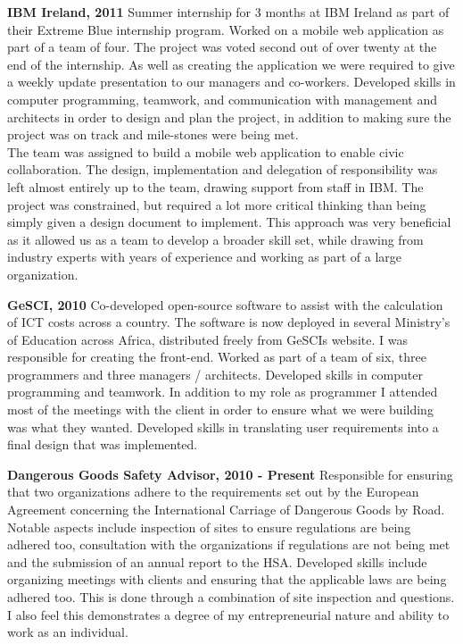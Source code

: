 \documentclass{res}
\begin{document}
\begin{resume}
    {\bf IBM Ireland, 2011 }Summer internship for 3 months at IBM Ireland as part of their Extreme Blue internship program. Worked on a mobile web application as part of a team of four. The project was voted second out of over twenty at the end of the internship. As well as creating the application we were required to give a weekly update presentation to our managers and co-workers. Developed skills in computer programming, teamwork, and communication with management and architects in order to design and plan the project, in addition to making sure the project was on track and mile-stones were being met.\\
     The team was assigned to build a mobile web application to enable civic collaboration. The design, implementation and delegation of responsibility was left almost entirely up to the team, drawing support from staff in IBM. The project was constrained, but required a lot more critical thinking than being simply given a design document to implement. This approach was very beneficial as it allowed us as a team to develop a broader skill set, while drawing from industry experts with years of experience and working as part of a large organization.
 
    {\bf GeSCI, 2010} Co-developed open-source software to assist with the calculation of ICT costs across a country. The software is now deployed in several Ministry's of Education across Africa, distributed freely from GeSCIs website. I was responsible for creating the front-end. Worked as part of a team of six, three programmers and three managers / architects. Developed skills in computer programming and teamwork. In addition to my role as programmer I attended most of the meetings with the client in order to ensure what we were building was what they wanted. Developed skills in translating user requirements into a final design that was implemented.

    {\bf Dangerous Goods Safety Advisor, 2010 - Present} Responsible for ensuring that two organizations adhere to the requirements set out by the European Agreement concerning the International Carriage of Dangerous Goods by Road. Notable aspects include inspection of sites to ensure regulations are being adhered too, consultation with the organizations if regulations are not being met and the submission of an annual report to the HSA. Developed skills include organizing meetings with clients and ensuring that the applicable laws are being adhered too. This is done through a combination of site inspection and questions. I also feel this demonstrates a degree of my entrepreneurial nature and ability to work as an individual.
 

\end{resume}
\end{document}
